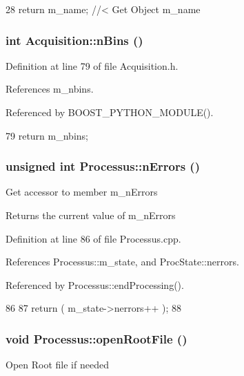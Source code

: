 \begin{DoxyCode}
28 { return m_name; } //< Get Object m_name
\end{DoxyCode}
\hypertarget{classAcquisition_a3a3dad0de9535d5a29c0810a5bdc3ae3}{
\subsubsection[{nBins}]{\setlength{\rightskip}{0pt plus 5cm}int Acquisition::nBins ()}}
\label{classAcquisition_a3a3dad0de9535d5a29c0810a5bdc3ae3}


Definition at line 79 of file Acquisition.h.

References m\_\-nbins.

Referenced by BOOST\_\-PYTHON\_\-MODULE().


\begin{DoxyCode}
79 {return m_nbins;}
\end{DoxyCode}
\hypertarget{classProcessus_a82a0487f82f07cc2c2dc2731f98149e7}{
\subsubsection[{nErrors}]{\setlength{\rightskip}{0pt plus 5cm}unsigned int Processus::nErrors ()}}
\label{classProcessus_a82a0487f82f07cc2c2dc2731f98149e7}
Get accessor to member m\_\-nErrors \begin{DoxyReturn}{Returns}
the current value of m\_\-nErrors 
\end{DoxyReturn}


Definition at line 86 of file Processus.cpp.

References Processus::m\_\-state, and ProcState::nerrors.

Referenced by Processus::endProcessing().


\begin{DoxyCode}
86                                 {
87   return ( m_state->nerrors++ );
88 }
\end{DoxyCode}
\hypertarget{classProcessus_aacf6812880c1d1a2bf14a4a39458f443}{
\subsubsection[{openRootFile}]{\setlength{\rightskip}{0pt plus 5cm}void Processus::openRootFile ()}}
\label{classProcessus_aacf6812880c1d1a2bf14a4a39458f443}
Open Root file if needed 

